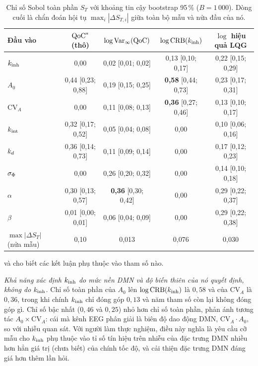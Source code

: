 \begin{table}[t]
\centering\small
\caption{Chỉ số Sobol toàn phần $S_T$ với khoảng tin cậy bootstrap 95\,\% ($B=1\,000$). Dòng cuối là chẩn đoán hội tụ $\max_i|\Delta S_{T,i}|$ giữa toàn bộ mẫu và nửa đầu của nó.}
\label{tab:sobol}
\footnotesize\setlength{\tabcolsep}{4pt}
\begin{tabular}{lcccc}
\toprule
Đầu vào & $\mathrm{QoC}^*$ (thô) & $\log\operatorname{Var}_\infty(\mathrm{QoC})$ & $\log\mathrm{CRB}(k_{\mathrm{inh}})$ & $\log$ hiệu quả LQG \\
\midrule
$k_{\mathrm{inh}}$          & 0,00 & 0,02 [0,01; 0,02] & 0,13 [0,10; 0,17] & 0,22 [0,15; 0,29] \\
$A_0$            & 0,44 [0,23; 0,88] & 0,19 [0,15; 0,25] & \textbf{0,58} [0,44; 0,73] & 0,23 [0,17; 0,31] \\
$\mathrm{CV}_A$  & 0,00 & 0,11 [0,08; 0,13] & \textbf{0,36} [0,27; 0,46] & 0,13 [0,10; 0,17] \\
$k_{\mathrm{int}}$          & 0,32 [0,17; 0,52] & 0,05 [0,04; 0,08] & 0,00 & 0,10 [0,06; 0,16] \\
$k_{d}$            & 0,36 [0,14; 0,73] & 0,11 [0,09; 0,14] & 0,00 & 0,17 [0,12; 0,23] \\
$\sigma_{\Phi}$          & 0,00 & 0,26 [0,20; 0,32] & 0,00 & 0,14 [0,10; 0,18] \\
$\alpha$         & 0,30 [0,13; 0,57] & \textbf{0,36} [0,30; 0,42] & 0,00 & 0,29 [0,22; 0,37] \\
$\beta$          & 0,01 [0,00; 0,01] & 0,06 [0,04; 0,09] & 0,00 & 0,29 [0,22; 0,38] \\
\midrule
$\max|\Delta S_T|$ (nửa mẫu) & 0,10 & 0,013 & 0,076 & 0,030 \\
\bottomrule
\end{tabular}
\end{table}

 và  cho biết các kết luận phụ thuộc vào tham số nào.

\emph{Khả năng xác định $k_{\mathrm{inh}}$ do mức nền DMN và độ biến thiên của nó quyết định, không do $k_{\mathrm{inh}}$.} Chỉ số toàn phần của $A_0$ lên $\log\mathrm{CRB}(k_{\mathrm{inh}})$ là $0{,}58$ và của $\mathrm{CV}_A$ là $0{,}36$, trong khi chính $k_{\mathrm{inh}}$ chỉ đóng góp $0{,}13$ và năm tham số còn lại không đóng góp gì. Chỉ số bậc nhất ($0{,}46$ và $0{,}25$) nhỏ hơn chỉ số toàn phần, phản ánh tương tác $A_0\times\mathrm{CV}_A$: cái mà kênh EEG phân giải là biên độ dao động DMN, $\mathrm{CV}_A\cdot A_0$, so với nhiễu quan sát. Với người làm thực nghiệm, điều này nghĩa là yêu cầu cỡ mẫu cho $k_{\mathrm{inh}}$ phụ thuộc vào tỉ số tín hiệu trên nhiễu của đặc trưng DMN nhiều hơn hẳn giá trị (chưa biết) của chính tốc độ, và cải thiện đặc trưng DMN đáng giá hơn thêm lần hỏi.

